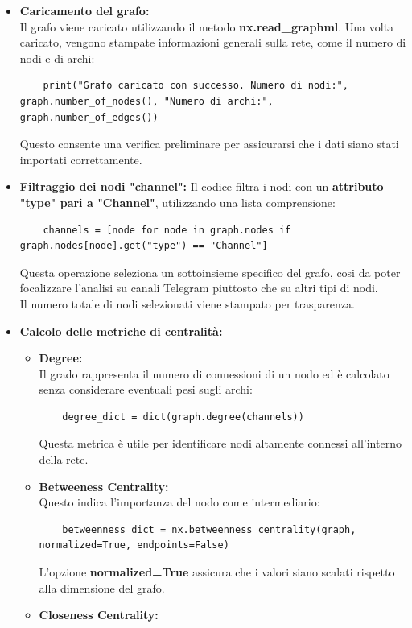 \documentclass[12pt]{article}
\begin{document}
	\begin{itemize}[label=] 
		\item \textbf{Caricamento del grafo:}\\
		Il grafo viene caricato utilizzando il metodo \textbf{nx.read\_graphml}. Una volta caricato, vengono stampate informazioni generali sulla rete, come il numero di nodi e di archi:
		\begin{lstlisting}
	print("Grafo caricato con successo. Numero di nodi:", graph.number_of_nodes(), "Numero di archi:", graph.number_of_edges())
		\end{lstlisting}
		Questo consente una verifica preliminare per assicurarsi che i dati siano stati importati correttamente.
		\item \textbf{Filtraggio dei nodi "channel":}
		Il codice filtra i nodi con un \textbf{attributo "type" pari a "Channel"}, utilizzando una lista comprensione:
		\begin{lstlisting}
	channels = [node for node in graph.nodes if graph.nodes[node].get("type") == "Channel"]
		\end{lstlisting}
		Questa operazione seleziona un sottoinsieme specifico del grafo, cosi da poter focalizzare l'analisi su canali Telegram piuttosto che su altri tipi di nodi. \\Il numero totale di nodi selezionati viene stampato per trasparenza.
		\item \textbf{Calcolo delle metriche di centralità:}
		\begin{itemize}
			\item \textbf{Degree:}\\
			Il grado rappresenta il numero di connessioni di un nodo ed è calcolato senza considerare eventuali pesi sugli archi:
			\begin{lstlisting}
	degree_dict = dict(graph.degree(channels))
			\end{lstlisting}
			Questa metrica è utile per identificare nodi altamente connessi all'interno della rete.
			\item \textbf{Betweeness Centrality:}\\ Questo indica l'importanza del nodo come intermediario:
			\begin{lstlisting}
	betweenness_dict = nx.betweenness_centrality(graph, normalized=True, endpoints=False)
			\end{lstlisting}
			L'opzione \textbf{normalized=True} assicura che i valori siano scalati rispetto alla dimensione del grafo.
			\item \textbf{Closeness Centrality:}\\

\end{itemize}
\end{itemize}
\end{document}
